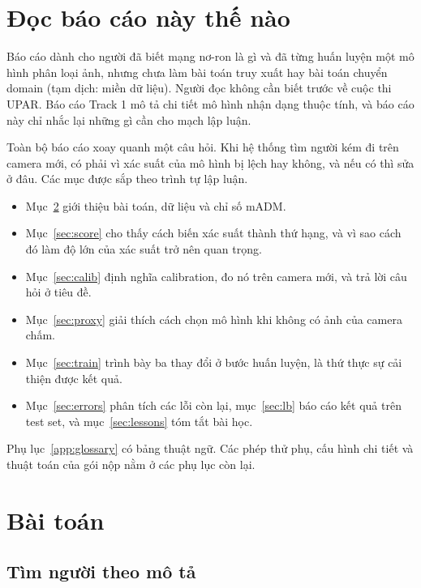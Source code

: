 \documentclass[11pt,a4paper]{article}
\begin{document}
\section{Đọc báo cáo này thế nào}

Báo cáo dành cho người đã biết mạng nơ-ron là gì và đã từng huấn luyện một mô hình phân loại ảnh, nhưng chưa làm bài toán truy xuất hay bài toán chuyển domain (tạm dịch: miền dữ liệu). Người đọc không cần biết trước về cuộc thi UPAR. Báo cáo Track 1 mô tả chi tiết mô hình nhận dạng thuộc tính, và báo cáo này chỉ nhắc lại những gì cần cho mạch lập luận.

Toàn bộ báo cáo xoay quanh một câu hỏi. Khi hệ thống tìm người kém đi trên camera mới, có phải vì xác suất của mô hình bị lệch hay không, và nếu có thì sửa ở đâu. Các mục được sắp theo trình tự lập luận.

\begin{itemize}[leftmargin=1.4em]
\item Mục~\ref{sec:task} giới thiệu bài toán, dữ liệu và chỉ số mADM.
\item Mục~\ref{sec:score} cho thấy cách biến xác suất thành thứ hạng, và vì sao cách đó làm độ lớn của xác suất trở nên quan trọng.
\item Mục~\ref{sec:calib} định nghĩa calibration, đo nó trên camera mới, và trả lời câu hỏi ở tiêu đề.
\item Mục~\ref{sec:proxy} giải thích cách chọn mô hình khi không có ảnh của camera chấm.
\item Mục~\ref{sec:train} trình bày ba thay đổi ở bước huấn luyện, là thứ thực sự cải thiện được kết quả.
\item Mục~\ref{sec:errors} phân tích các lỗi còn lại, mục~\ref{sec:lb} báo cáo kết quả trên test set, và mục~\ref{sec:lessons} tóm tắt bài học.
\end{itemize}

Phụ lục~\ref{app:glossary} có bảng thuật ngữ. Các phép thử phụ, cấu hình chi tiết và thuật toán của gói nộp nằm ở các phụ lục còn lại.

\section{Bài toán}
\label{sec:task}

\subsection{Tìm người theo mô tả}
\end{document}
